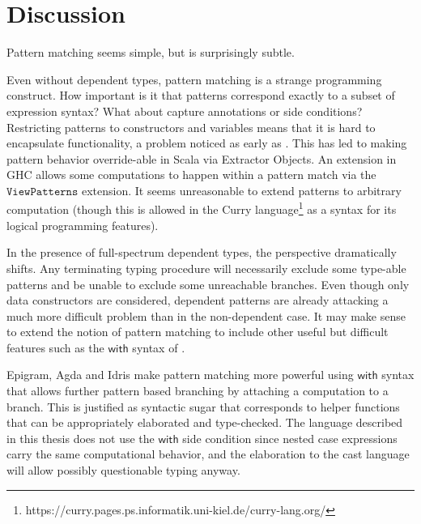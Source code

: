 \section{Discussion}



Pattern matching seems simple, but is surprisingly subtle.

Even without dependent types, pattern matching is a strange programming construct. 
How important is it that patterns correspond exactly to a subset of expression syntax?
What about capture annotations or side conditions?
Restricting patterns to constructors and variables means that it is hard to encapsulate functionality, a problem noticed as early as \cite{10.1145/41625.41653}. 
This has led to making pattern behavior override-able in Scala via Extractor Objects.
An extension in GHC allows some computations to happen within a pattern match via the $\mathtt{ViewPatterns}$ extension.
It seems unreasonable to extend patterns to arbitrary computation (though this is allowed in the Curry language\footnote{https://curry.pages.ps.informatik.uni-kiel.de/curry-lang.org/} as a syntax for its logical programming features). 

In the presence of full-spectrum dependent types, the perspective dramatically shifts.
Any terminating typing procedure will necessarily exclude some type-able patterns and be unable to exclude some unreachable branches.
Even though only data constructors are considered, dependent patterns are already attacking a much more difficult problem than in the non-dependent case.
It may make sense to extend the notion of pattern matching to include other useful but difficult features such as the $\mathsf{with}$ syntax of \cite{mcbride_mckinna_2004}.


Epigram, Agda and Idris make pattern matching more powerful using $\mathsf{with}$ syntax that allows further pattern based branching by attaching a computation to a branch.
This is justified as syntactic sugar that corresponds to helper functions that can be appropriately elaborated and type-checked.
The language described in this thesis does not use the $\mathsf{with}$ side condition since nested case expressions carry the same computational behavior, and the elaboration to the cast language will allow possibly questionable typing anyway.


